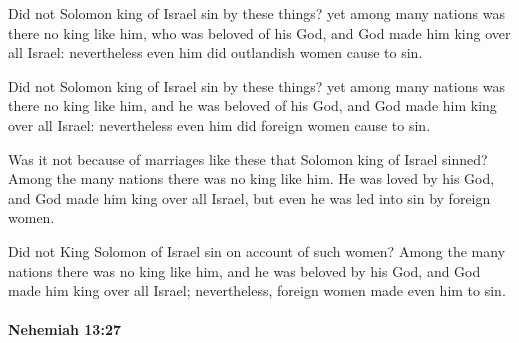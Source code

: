 			Did not Solomon king of Israel sin by these things? yet among many nations was there no king like him, who was beloved of his God, and God made him king over all Israel: nevertheless even him did outlandish women cause to sin.

			\begin{versebox}
					\item[BHS] 
					\item[LXX] 
					\item[ASV] Did not Solomon king of Israel sin by these things? yet among many nations was there no king like him, and he was beloved of his God, and God made him king over all Israel: nevertheless even him did foreign women cause to sin.
					\item[NIV] Was it not because of marriages like these that Solomon king of Israel sinned? Among the many nations there was no king like him. He was loved by his God, and God made him king over all Israel, but even he was led into sin by foreign women.
					\item[NRSV] Did not King Solomon of Israel sin on account of such women? Among the many nations there was no king like him, and he was beloved by his God, and God made him king over all Israel; nevertheless, foreign women made even him to sin.
			\end{versebox}

		\paragraph{Nehemiah 13:27} %
			\label{NEHEMIAH-13-27}

